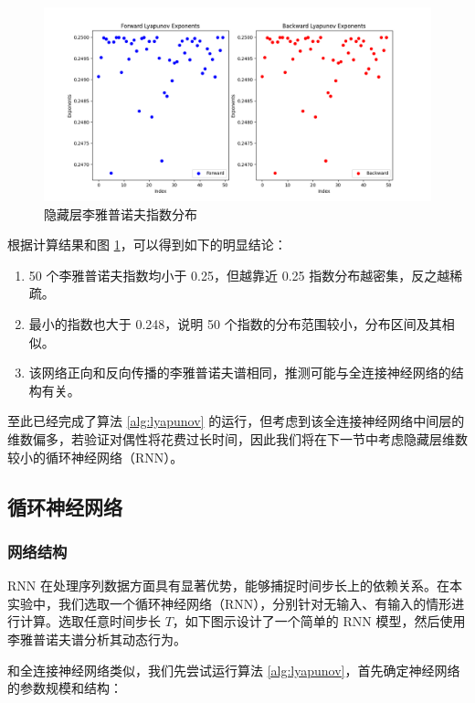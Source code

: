 \begin{figure}[htbp]
  \centering
  \includegraphics[width=1\textwidth]{figures/nn_lyapunov_exponents.png}
  \caption{隐藏层李雅普诺夫指数分布}
  \label{fig:nn_lyapunov_exponents}
\end{figure}

根据计算结果和图 \ref{fig:nn_lyapunov_exponents}，可以得到如下的明显结论：

\begin{enumerate}
  \item 50 个李雅普诺夫指数均小于 0.25，但越靠近 0.25 指数分布越密集，反之越稀疏。
  \item 最小的指数也大于 0.248，说明 50 个指数的分布范围较小，分布区间及其相似。
  \item 该网络正向和反向传播的李雅普诺夫谱相同，推测可能与全连接神经网络的结构有关。
\end{enumerate}

至此已经完成了算法 \ref{alg:lyapunov} 的运行，但考虑到该全连接神经网络中间层的维数偏多，若验证对偶性将花费过长时间，因此我们将在下一节中考虑隐藏层维数较小的循环神经网络（RNN）。

\subsection{循环神经网络}\label{sec:rnn}

\subsubsection{网络结构}

RNN 在处理序列数据方面具有显著优势，能够捕捉时间步长上的依赖关系。在本实验中，我们选取一个循环神经网络（RNN），分别针对无输入、有输入的情形进行计算。选取任意时间步长 $T$，如下图示设计了一个简单的 RNN 模型，然后使用李雅普诺夫谱分析其动态行为。

和全连接神经网络类似，我们先尝试运行算法 \ref{alg:lyapunov}，首先确定神经网络的参数规模和结构：

